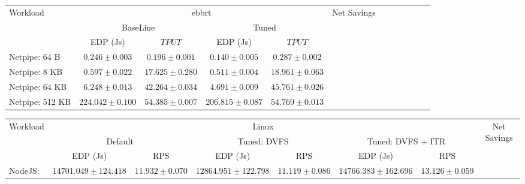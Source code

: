 \begin{table*}[t]
\begin{center}
\begin{tabular}{|l|cc|cc|cc||cc|cc||c|} \hline

\multirow{2}{*}{Workload} & \multicolumn{4}{c|}{ebbrt} & \multirow{2}{*}{Net Savings}\\ 
& \multicolumn{2}{c}{BaseLine} & \multicolumn{2}{c|}{Tuned} &\\
\hline
 & EDP (Js)& $TPUT$ & EDP (Js) & $TPUT$ & \\  \hline

Netpipe: 64 B & $0.246 \pm 0.003$ & $0.196 \pm 0.001$ & $0.140 \pm 0.005$ & $0.287 \pm 0.002$ \\ \hline
Netpipe: 8 KB & $0.597 \pm 0.022$ & $17.625 \pm 0.280$ & $0.511 \pm 0.004$ & $18.961 \pm 0.063$ \\ \hline
Netpipe: 64 KB & $6.248 \pm 0.013$ & $42.264 \pm 0.034$ & $4.691 \pm 0.009$ & $45.761 \pm 0.026$ \\ \hline
Netpipe: 512 KB & $224.042 \pm 0.100$ & $54.385 \pm 0.007$ & $206.815 \pm 0.087$ & $54.769 \pm 0.013$ \\ \hline

\hline \hline
\end{tabular}
\end{center}
\label{tab:netpipe_ebbrt}
\end{table*}

\begin{table*}[t]
\begin{center}
\begin{tabular}{|l||cc|cc||cc||c|} \hline
\multirow{2}{*}{Workload} & \multicolumn{6}{c|}{Linux} & \multirow{2}{*}{Net Savings}\\ 
& \multicolumn{2}{c}{Default} & \multicolumn{2}{c}{Tuned: DVFS} & \multicolumn{2}{c|}{Tuned: DVFS + ITR} &\\
\hline

 & EDP (Js)& RPS & EDP (Js) & RPS & EDP (Js) & RPS & \\  \hline

NodeJS: & $14701.049 \pm 124.418$ & $11.932 \pm 0.070$ & $12864.951 \pm 122.798$ & $11.119 \pm 0.086$ & $14766.383 \pm 162.696$ & $13.126 \pm 0.059$ \\ \hline

\hline \hline
\end{tabular}
\end{center}
\end{table*}

